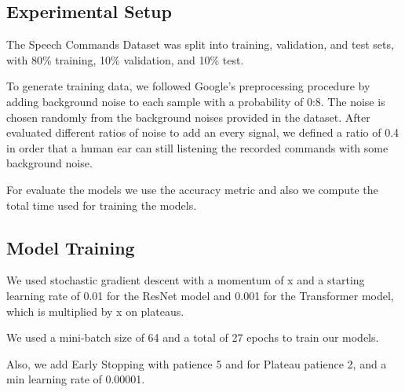 \subsection{Experimental Setup}

The Speech Commands Dataset was
split into training, validation, and test sets, with 80\% training,
10\% validation, and 10\% test.

To generate training data, we followed Google's preprocessing
procedure by adding background noise to each
sample with a probability of 0:8. The noise is chosen randomly from the background noises provided
in the dataset. After evaluated different ratios of noise to add an every signal, we defined a ratio of 0.4 in order that a human ear can still listening the recorded commands with some background noise. 

For evaluate the models we use the accuracy metric and also we compute the total time used for training the models.

\subsection{Model Training}

We used stochastic gradient descent with a momentum of x and a starting learning rate of 0.01 for the ResNet model and 0.001 for the Transformer model, which is multiplied by x on plateaus. 

We used a mini-batch size of 64 and a total of 27 epochs to train our models.

Also, we add Early Stopping with patience 5 and for Plateau patience 2, and a min learning rate of 0.00001.
